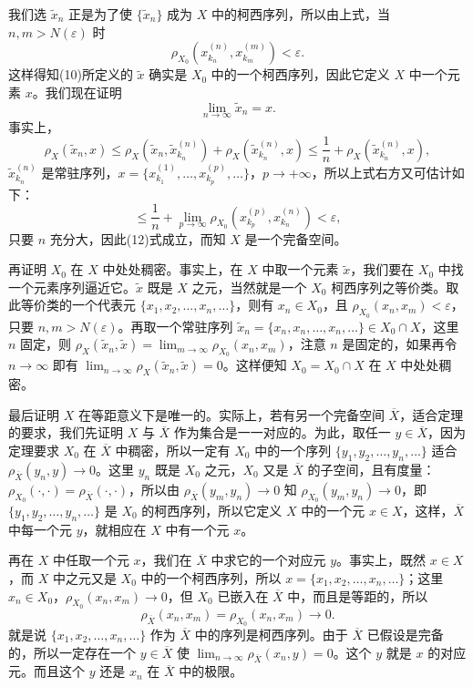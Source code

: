 我们选 $\widetilde x_n$ 正是为了使 $\{\widetilde x_n\}$ 成为 $X$ 中的柯西序列，所以由上式，当 $n,m>N(\varepsilon)$ 时
\[
 \rho_{X_0}(x_{k_n}^{(n)},x_{k_m}^{(m)})<\varepsilon.
\]
这样得知(10)所定义的 $\widetilde x$ 确实是 $X_0$ 中的一个柯西序列，因此它定义 $X$ 中一个元素 $x$。我们现在证明
\begin{equation}
 \lim_{n\to\infty}\widetilde x_n=x.
 \tag{12}
\end{equation}
事实上，
\[
 \rho_X(\widetilde x_n,x)\le \rho_X(\widetilde x_n,\widetilde x_{k_n}^{(n)})+\rho_X(\widetilde x_{k_n}^{(n)},x)
 \le\frac1n+\rho_X(\widetilde x_{k_n}^{(n)},x),
\]
$\widetilde x_{k_n}^{(n)}$ 是常驻序列，$x=\{x_{k_1}^{(1)},\ldots,x_{k_p}^{(p)},\ldots\}$，$p\to+\infty$，所以上式右方又可估计如下：
\[
 \le\frac1n+\lim_{p\to\infty}\rho_{X_0}(x_{k_p}^{(p)},x_{k_n}^{(n)})<\varepsilon,
\]
只要 $n$ 充分大，因此(12)式成立，而知 $X$ 是一个完备空间。

再证明 $X_0$ 在 $X$ 中处处稠密。事实上，在 $X$ 中取一个元素 $\widetilde x$，我们要在 $X_0$ 中找一个元素序列逼近它。$\widetilde x$ 既是 $X$ 之元，当然就是一个 $X_0$ 柯西序列之等价类。取此等价类的一个代表元 $\{x_1,x_2,\ldots,x_n,\ldots\}$，则有 $x_n\in X_0$，且 $\rho_{X_0}(x_n,x_m)<\varepsilon$，只要 $n,m>N(\varepsilon)$。再取一个常驻序列 $\widetilde x_n=\{x_n,x_n,\ldots,x_n,\ldots\}\in X_0\cap X$，这里 $n$ 固定，则 $\rho_X(\widetilde x_n,\widetilde x)=\lim_{m\to\infty}\rho_{X_0}(x_n,x_m)$，注意 $n$ 是固定的，如果再令 $n\to\infty$ 即有 $\lim_{n\to\infty}\rho_X(\widetilde x_n,\widetilde x)=0$。这样便知 $X_0=X_0\cap X$ 在 $X$ 中处处稠密。

最后证明 $X$ 在等距意义下是唯一的。实际上，若有另一个完备空间 $\overline X$，适合定理的要求，我们先证明 $X$ 与 $\overline X$ 作为集合是一一对应的。为此，取任一 $y\in\overline X$，因为定理要求 $X_0$ 在 $\overline X$ 中稠密，所以一定有 $X_0$ 中的一个序列 $\{y_1,y_2,\ldots,y_n,\ldots\}$ 适合 $\rho_{\overline X}(y_n,y)\to0$。这里 $y_n$ 既是 $X_0$ 之元，$X_0$ 又是 $\overline X$ 的子空间，且有度量：$\rho_{X_0}(\cdot,\cdot)=\rho_{\overline X}(\cdot,\cdot)$，所以由 $\rho_{\overline X}(y_m,y_n)\to0$ 知 $\rho_{X_0}(y_m,y_n)\to0$，即 $\{y_1,y_2,\ldots,y_n,\ldots\}$ 是 $X_0$ 的柯西序列，所以它定义 $X$ 中的一个元 $x\in X$，这样，$\overline X$ 中每一个元 $y$，就相应在 $X$ 中有一个元 $x$。

再在 $X$ 中任取一个元 $x$，我们在 $\overline X$ 中求它的一个对应元 $y$。事实上，既然 $x\in X$，而 $X$ 中之元又是 $X_0$ 中的一个柯西序列，所以 $x=\{x_1,x_2,\ldots,x_n,\ldots\}$；这里 $x_n\in X_0$，$\rho_{X_0}(x_n,x_m)\to0$，但 $X_0$ 已嵌入在 $\overline X$ 中，而且是等距的，所以
\[
 \rho_{\overline X}(x_n,x_m)=\rho_{X_0}(x_n,x_m)\to0.
\]
就是说 $\{x_1,x_2,\ldots,x_n,\ldots\}$ 作为 $\overline X$ 中的序列是柯西序列。由于 $\overline X$ 已假设是完备的，所以一定存在一个 $y\in\overline X$ 使 $\lim_{n\to\infty}\rho_{\overline X}(x_n,y)=0$。这个 $y$ 就是 $x$ 的对应元。而且这个 $y$ 还是 $x_n$ 在 $\overline X$ 中的极限。

